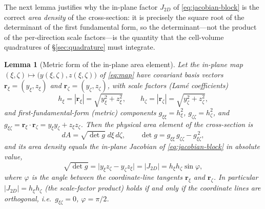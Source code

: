\documentclass[11pt]{article}
\newtheorem{lemma}{Lemma}
\theoremstyle{definition}
\theoremstyle{remark}
\begin{document}
The next lemma justifies why the in-plane factor $J_{2D}$ of
\eqref{eq:jacobian-block} is the correct \emph{area density} of the cross-section:
it is precisely the square root of the determinant of the first fundamental form,
so the determinant---not the product of the per-direction scale factors---is the
quantity that the cell-volume quadratures of \S\ref{sec:quadrature} must integrate.

\begin{lemma}[Metric form of the in-plane area element]
\label{lem:area-metric}
Let the in-plane map $(\xi,\zeta)\mapsto\bigl(y(\xi,\zeta),z(\xi,\zeta)\bigr)$ of
\eqref{eq:map} have covariant basis vectors
$\mathbf r_\xi=(y_\xi,z_\xi)$ and $\mathbf r_\zeta=(y_\zeta,z_\zeta)$, with scale
factors (Lam\'e coefficients)
\begin{equation}
h_\xi=|\mathbf r_\xi|=\sqrt{y_\xi^2+z_\xi^2},
\qquad
h_\zeta=|\mathbf r_\zeta|=\sqrt{y_\zeta^2+z_\zeta^2},
\label{eq:lame}
\end{equation}
and first-fundamental-form (metric) components
$g_{\xi\xi}=h_\xi^2$, $g_{\zeta\zeta}=h_\zeta^2$, and
$g_{\xi\zeta}=\mathbf r_\xi\!\cdot\!\mathbf r_\zeta=y_\xi y_\zeta+z_\xi z_\zeta$.
Then the physical area element of the cross-section is
\begin{equation}
dA=\sqrt{\det g}\;d\xi\,d\zeta,
\qquad
\det g=g_{\xi\xi}\,g_{\zeta\zeta}-g_{\xi\zeta}^{\,2},
\label{eq:area-metric}
\end{equation}
and its area density equals the in-plane Jacobian of \eqref{eq:jacobian-block} in
absolute value,
\begin{equation}
\sqrt{\det g}
=\bigl|y_\xi z_\zeta-y_\zeta z_\xi\bigr|
=|J_{2D}|
=h_\xi h_\zeta\sin\varphi,
\label{eq:area-jac}
\end{equation}
where $\varphi$ is the angle between the coordinate-line tangents
$\mathbf r_\xi$ and $\mathbf r_\zeta$. In particular
$|J_{2D}|=h_\xi h_\zeta$ (the scale-factor product) holds if and only if the
coordinate lines are orthogonal, i.e.\ $g_{\xi\zeta}=0$, $\varphi=\pi/2$.
\end{lemma}
\end{document}
